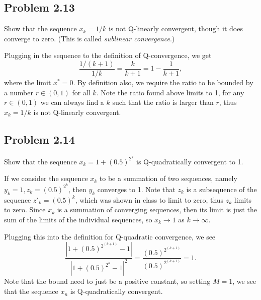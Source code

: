  \subsection{Problem 2.13}
 Show that the sequence $x_k = 1/k$ is not Q-linearly convergent, though it does converge to zero. (This is called \textit{sublinear convergence}.)
 \partbreak
 \begin{solution}
 
     Plugging in the sequence to the definition of Q-convergence, we get
     \[
     \frac{1/(k+1)}{1/k} = \frac{k}{k+1} = 1 - \frac{1}{k+1},
     \]
     where the limit $x^* = 0$. By definition also, we require the ratio to be bounded by a number $r \in (0, 1)$ for all $k$. Note the ratio found above limits to 1, for any $r \in (0, 1)$ we can always find a $k$ such that the ratio is larger than $r$, thus $x_k = 1/k$ is not Q-linearly convergent.
 \end{solution}

 \newpage
 \subsection{Problem 2.14}
 Show that the sequence $x_k = 1 + (0.5)^{2^k}$ is Q-quadratically convergent to 1.
 \partbreak
 \begin{solution}

     If we consider the sequence $x_k$ to be a summation of two sequences, namely $y_k = 1, z_k = (0.5)^{2^k}$, then $y_k$ converges to 1. Note that $z_k$ is a subsequence of the sequence $z'_k = (0.5)^k$, which was shown in class to limit to zero, thus $z_k$ limits to zero. Since $x_k$ is a summation of converging sequences, then its limit is just the sum of the limits of the individual sequences, so $x_k \rightarrow 1$ as $k \rightarrow \infty$. \par 
     
     Plugging this into the definition for Q-quadratic convergence, we see
     \[
     \frac{|1 + (0.5)^{2^{(k+1)}} - 1|}{|1 + (0.5)^{2^k} - 1|^2} = \frac{(0.5)^{2^{(k+1)}}}{(0.5)^{2^{(k+1)}}} = 1.
     \]
     Note that the bound need to just be a positive constant, so setting $M = 1$, we see that the sequence $x_n$ is Q-quadratically convergent.
 \end{solution}

 \newpage
